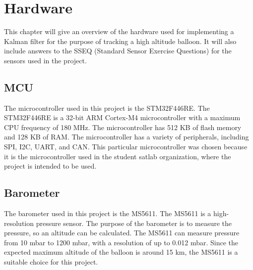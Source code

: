 \chapter{Hardware}\label{ch:hardware}
This chapter will give an overview of the hardware used for implementing a Kalman filter for the purpose of tracking a high altitude balloon.
It will also include answers to the SSEQ (Standard Sensor Exercise Questions) for the sensors used in the project.


\section{MCU}\label{sec:mcu}
The microcontroller used in this project is the STM32F446RE. The STM32F446RE is a 32-bit ARM Cortex-M4 microcontroller with a maximum CPU frequency of 180 MHz.
The microcontroller has 512 KB of flash memory and 128 KB of RAM.
The microcontroller has a variety of peripherals, including SPI, I2C, UART, and CAN.
This particular microcontroller was chosen because it is the microcontroller used in the student satlab organization, where the project is intended to be used.


\section{Barometer}\label{sec:barometer}
The barometer used in this project is the MS5611.
The MS5611 is a high-resolution pressure sensor. The purpose of the barometer is to measure the pressure, so an altitude can be calculated.
The MS5611 can measure pressure from 10 mbar to 1200 mbar, with a resolution of up to 0.012 mbar. %
Since the expected maximum altitude of the balloon is around 15 km, the MS5611 is a suitable choice for this project.

